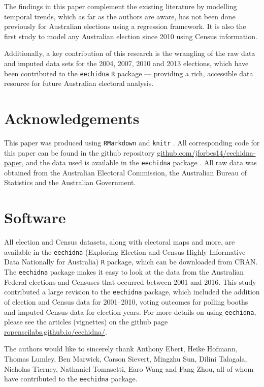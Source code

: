 \documentclass[11pt,a4paper,]{article}
\begin{document}
The findings in this paper complement the existing literature by
modelling temporal trends, which as far as the authors are aware, has
not been done previously for Australian elections using a regression
framework. It is also the first study to model any Australian election
since 2010 using Census information.

Additionally, a key contribution of this research is the wrangling of
the raw data and imputed data sets for the 2004, 2007, 2010 and 2013
elections, which have been contributed to the \texttt{eechidna}
\texttt{R} package --- providing a rich, accessible data resource for
future Australian electoral analysis.

\section{Acknowledgements}\label{acknowledgements}

This paper was produced using \texttt{RMarkdown} \autocite{rmarkdown}
and \texttt{knitr} \autocite{knitr}. All corresponding code for this
paper can be found in the github repository
\href{https://github.com/jforbes14/eechidna-paper}{github.com/jforbes14/eechidna-paper},
and the data used is available in the \texttt{eechidna} package
\autocite{eechidna}. All raw data was obtained from the Australian
Electoral Commission, the Australian Bureau of Statistics and the
Australian Government.

\section{Software}\label{software}

All election and Census datasets, along with electoral maps and more,
are available in the \texttt{eechidna} (Exploring Election and Census
Highly Informative Data Nationally for Australia) \texttt{R} package,
which can be downloaded from CRAN. The \texttt{eechidna} package makes
it easy to look at the data from the Australian Federal elections and
Censuses that occurred between 2001 and 2016. This study contributed a
large revision to the \texttt{eechidna} package, which included the
addition of election and Census data for 2001--2010, voting outcomes for
polling booths and imputed Census data for election years. For more
details on using \texttt{eechidna}, please see the articles (vignettes)
on the github page
\href{https://ropenscilabs.github.io/eechidna/}{ropenscilabs.github.io/eechidna/}.

The authors would like to sincerely thank Anthony Ebert, Heike Hofmann,
Thomas Lumley, Ben Marwick, Carson Sievert, Mingzhu Sun, Dilini
Talagala, Nicholas Tierney, Nathaniel Tomasetti, Earo Wang and Fang
Zhou, all of whom have contributed to the \texttt{eechidna} package.

\printbibliography
\end{document}
